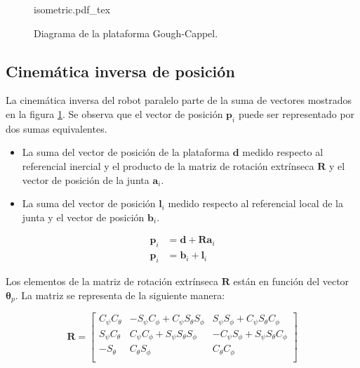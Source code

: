 \begin{figure}[htb!]
    \centering
    {isometric.pdf_tex}
    \caption{Diagrama de la plataforma Gough-Cappel.}
    \label{fig: gough stewart diagram}
\end{figure}

\subsection{Cinemática inversa de posición}

La cinemática inversa del robot paralelo parte de la suma de vectores 
mostrados en la figura \ref{fig: gough stewart diagram}.
Se observa que el vector de posición $\mathbf p_i$ puede ser representado 
por dos sumas equivalentes. 
\begin{itemize}
 \item La suma del vector de posición de la plataforma $\mathbf d$ 
medido respecto al referencial inercial y el producto de 
la matriz de rotación extrínseca $\mathbf R$ y el vector de posición 
de la junta $\mathbf a_i$. 
 \item La suma del vector de posición $\mathbf l_i$ medido respecto 
 al referencial local de la junta y el vector de posición $\mathbf b_i$.
\end{itemize}

\begin{subequations} \label{eq: plat_grl}
 \begin{align}
    \mathbf p_i & = \mathbf d + \mathbf R\mathbf a_i \\
    \mathbf p_i & = \mathbf b_i + \mathbf l_i
 \end{align}
\end{subequations}


Los elementos de la matriz de rotación 
extrínseca $\mathbf R$ están en función del vector $\mathbf \theta_p$.
La matriz se representa de la siguiente manera:

\begin{equation} \label{eq: Mrot-P}
\mathbf R = \begin{bmatrix}
C_\psi C_\theta & -S_\psi C_\phi + C_\psi S_\theta S_\phi & S_\psi S_\phi + C_\psi S_\theta C_\phi\\
S_\psi C_\theta & C_\psi C_\phi + S_\psi S_\theta S_\phi & -C_\psi S_\phi + S_\psi S_\theta C_\phi\\
-S_\theta & C_\theta S_\phi & C_\theta C_\phi\\
\end{bmatrix}
\end{equation}

